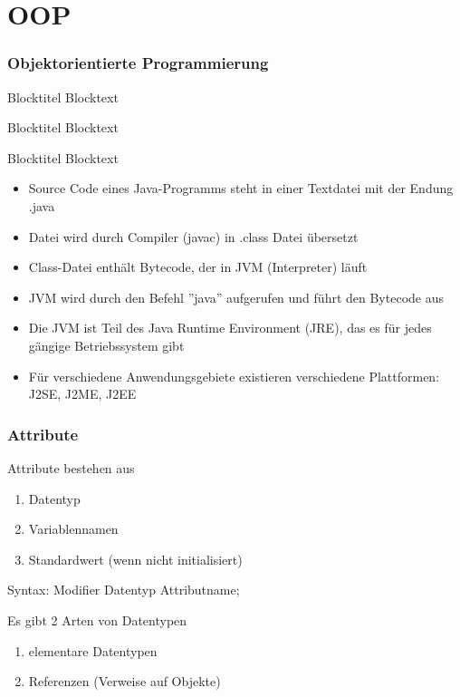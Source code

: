 \section{OOP}
\begin{frame}
\frametitle{Objektorientierte Programmierung}
\begin{block}{Blocktitel}
Blocktext 
\end{block}

\begin{exampleblock}{Blocktitel}
Blocktext 
\end{exampleblock}


\begin{alertblock}{Blocktitel}
Blocktext 
\end{alertblock}

\end{frame}


\begin{itemize}
  \item Source Code eines Java-Programms steht in einer Textdatei mit der
		Endung .java
  \item Datei wird durch Compiler (javac) in .class Datei \"ubersetzt
  \item Class-Datei enth\"alt Bytecode, der in JVM (Interpreter) l\"auft\\
  \item JVM wird durch den Befehl ''java'' aufgerufen und f\"uhrt den
		Bytecode aus
  \item Die JVM ist Teil des Java Runtime Environment (JRE), das es f\"ur jedes
  		g\"angige Betriebssystem gibt
  \item F\"ur verschiedene Anwendungsgebiete existieren verschiedene
  		Plattformen:\\
  		J2SE, J2ME, J2EE
\end{itemize}

\begin{frame}[fragile]
	  \frametitle{Attribute}
	  \begin{block}{Attribute bestehen aus}
		  \begin{enumerate}
		  	\item Datentyp
		  	\item Variablennamen
		  	\item Standardwert (wenn nicht initialisiert)
		  \end{enumerate}
		  Syntax: Modifier Datentyp Attributname;
	  \end{block}
	  \begin{block}{Es gibt 2 Arten von Datentypen}
		  	\begin{enumerate}
	  			\item elementare Datentypen
	  			\item Referenzen (Verweise auf Objekte)
	  		\end{enumerate}
	  \end{block}
\end{frame}